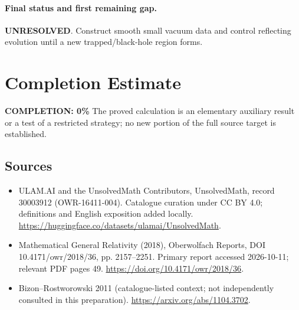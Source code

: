 \documentclass[11pt]{article}
\begin{document}
\paragraph{Final status and first remaining gap.}
\textbf{UNRESOLVED}. Construct smooth small vacuum data and control reflecting evolution until a new trapped/black-hole region forms.

\section{Completion Estimate}
\noindent\textbf{COMPLETION: 0\%}
The proved calculation is an elementary auxiliary result or a test of a restricted strategy; no new portion of the full source target is established.

\subsection{Sources}
\begin{itemize}
\item[\hypertarget{source:30003912:1}{S1}] ULAM.AI and the UnsolvedMath Contributors, UnsolvedMath, record 30003912 (OWR-16411-004). Catalogue curation under CC BY 4.0; definitions and English exposition added locally.
\url{https://huggingface.co/datasets/ulamai/UnsolvedMath}.
\item[\hypertarget{source:30003912:2}{S2}] Mathematical General Relativity (2018), Oberwolfach Reports, DOI 10.4171/owr/2018/36, pp. 2157--2251. Primary report accessed 2026-10-11; relevant PDF pages 49.
\url{https://doi.org/10.4171/owr/2018/36}.
\item[\hypertarget{source:30003912:3}{S3}] Bizon--Rostworowski 2011 (catalogue-listed context; not independently consulted in this preparation).
\url{https://arxiv.org/abs/1104.3702}.
\end{itemize}
\label{end:30003912}
\end{document}

